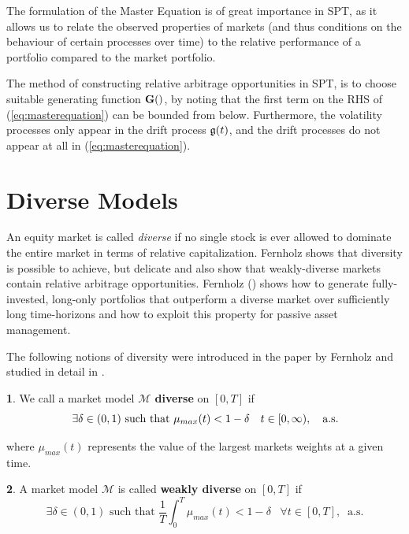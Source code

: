 \documentclass[british]{amsart} \usepackage{lmodern}
\numberwithin{equation}{section} \numberwithin{figure}{section}
\theoremstyle{plain} \newtheorem{thm}{\protect\theoremname}[section]
\theoremstyle{definition} \newtheorem{defn}[thm]{\protect\definitionname}
\theoremstyle{plain} \newtheorem{assumption}[thm]{\protect\assumptionname}
\theoremstyle{plain} \newtheorem{lem}[thm]{\protect\lemmaname}
\theoremstyle{plain} \newtheorem{prop}[thm]{\protect\propositionname}
\theoremstyle{remark} \newtheorem{rem}[thm]{\protect\remarkname}
\theoremstyle{plain} \newtheorem{cor}[thm]{\protect\corollaryname}
\begin{document}
The formulation of the Master Equation is of great importance in SPT, as it
allows us to relate the observed properties of markets (and thus conditions on
the behaviour of certain processes over time) to the relative performance of a
portfolio compared to the market portfolio. 

The method of constructing relative arbitrage opportunities in SPT, is to choose
suitable generating function $\G$, by noting that the first term on the RHS of
(\ref{eq:masterequation}) can be bounded from below. Furthermore, the volatility
processes only appear in the drift process $\mathfrak{g}(t)$, and the drift processes do not
appear at all in (\ref{eq:masterequation}).

\newpage
\section{Diverse Models}

An equity market is called \textit{diverse}
if no single stock is ever allowed to dominate the entire market in
terms of relative capitalization. Fernholz \cite{fernholz2005relative} shows
that diversity is possible to achieve, but delicate and also show
that weakly-diverse markets contain relative arbitrage opportunities.
Fernholz (\cite{fernholz2002}) shows how to generate fully-invested,
long-only portfolios that outperform a diverse market over sufficiently
long time-horizons and how to exploit this property for passive asset
management.

The following notions of diversity were introduced in the paper by
Fernholz \cite{fernholz1999diversity} and studied in detail in
\cite{fernholz2002}.

\begin{defn}
  \label{def:defnD}We call a market model \textbf{$\mathcal{M}$ diverse
  }on $[0,T]$ if 
  \begin{equation}
    \exists\delta\in(0,1)\text{ such that }
      \mu_{max}(t)<1-\delta
    \quad t\in[0,\infty),
    \quad \text{a.s.}
  \end{equation}

  where $\mu_{max}(t)$ represents the value of the largest markets
  weights at a given time. 
\end{defn}

\begin{defn}
  A market model\textbf{ $\mathcal{M}$} is called \textbf{weakly diverse}
  on $[0,T]$ if 
  \begin{equation}
    \exists\delta\in(0,1)\text{ such that }\frac{1}{T}\int_{0}^{T}\mu_{max}(t)<1-\delta\;\;\;\forall t\in[0,T],\;\;\text{a.s.}
  \end{equation}
\end{defn}
\end{document}

